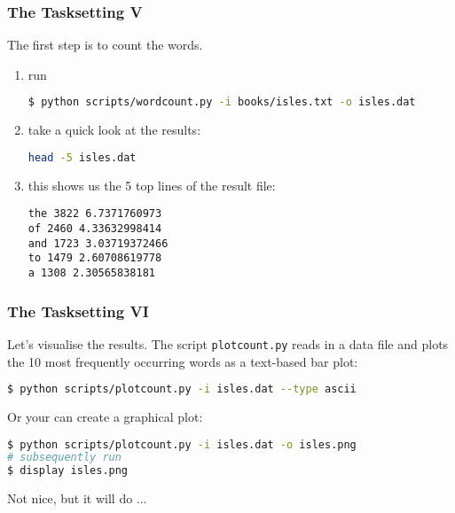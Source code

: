 \begin{frame}[fragile]
  \frametitle{The Tasksetting V}
  The first step is to count the words.\newline
  \begin{enumerate}
   \item run \begin{lstlisting}[language=Bash, style=Shell, basicstyle=\footnotesize] 
$ python scripts/wordcount.py -i books/isles.txt -o isles.dat           
             \end{lstlisting}
  \item take a quick look at the results:
        \begin{lstlisting}[language=Bash, style=Shell] 
head -5 isles.dat
        \end{lstlisting}
  \item this shows us the 5 top lines of the result file:
  \begin{lstlisting}[style=Plain]
the 3822 6.7371760973
of 2460 4.33632998414
and 1723 3.03719372466
to 1479 2.60708619778
a 1308 2.30565838181
  \end{lstlisting}
   \end{enumerate}
\end{frame}

\begin{frame}[fragile]
  \frametitle{The Tasksetting VI}
  Let’s visualise the results. The script \texttt{plotcount.py} reads in a data file and plots the 10 most frequently occurring words as a text-based bar plot:
  \begin{lstlisting}[language=Bash, style=Shell] 
$ python scripts/plotcount.py -i isles.dat --type ascii
  \end{lstlisting}
  \pause
  Or your can create a graphical plot:
  \begin{lstlisting}[language=Bash, style=Shell] 
$ python scripts/plotcount.py -i isles.dat -o isles.png
# subsequently run
$ display isles.png
  \end{lstlisting}
  \pause
  Not nice, but it will do ...
\end{frame}

